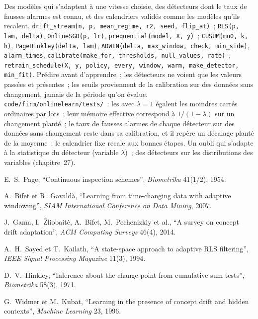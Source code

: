 \begin{build}
 Des modèles qui s'adaptent à une vitesse choisie, des détecteurs dont le taux de fausses alarmes est connu, et des calendriers validés comme
les modèles qu'ils recalent.
 \texttt{drift\_stream(n, p, mean\_regime, r2, seed, flip\_at)}~; \texttt{RLS(p, lam, delta)},
\texttt{OnlineSGD(p, lr)}, \texttt{prequential(model, X, y)}~; \texttt{CUSUM(mu0, k, h)}, \texttt{PageHinkley(delta, lam)},
\texttt{ADWIN(delta, max\_window, check, min\_side)}, \texttt{alarm\_times},
\texttt{calibrate(make\_for, thresholds, null\_values, rate)}~; \texttt{retrain\_schedule(X, y, policy, every, window, warm, make\_detector, min\_fit)}.
 Prédire avant d'apprendre~; les détecteurs ne voient que les valeurs passées et présentes~; les seuils proviennent de la calibration sur
des données sans changement, jamais de la période qu'on évalue.
 \texttt{code/firm/onlinelearn/tests/}~: les  avec $\lambda = 1$ égalent les moindres carrés ordinaires par lots~; leur mémoire effective
correspond à $1/(1-\lambda)$ sur un changement planté~; le taux de fausses alarmes de chaque détecteur sur des données sans changement reste dans
sa calibration, et il repère un décalage planté de la moyenne~; le calendrier fixe recale aux bonnes étapes.
 Un oubli qui s'adapte à la statistique du détecteur (variable $\lambda$)~; des détecteurs sur les
distributions des variables (chapitre~27).
\end{build}

\begin{omsources}
\item E.~S.~Page, ``Continuous inspection schemes'', \emph{Biometrika} 41(1/2), 1954.
\item A.~Bifet et R.~Gavaldà, ``Learning from time-changing data with adaptive windowing'', \emph{SIAM International
Conference on Data Mining}, 2007.
\item J.~Gama, I.~Žliobaitė, A.~Bifet, M.~Pechenizkiy et al., ``A survey on concept drift adaptation'', \emph{ACM
Computing Surveys} 46(4), 2014.
\item A.~H.~Sayed et T.~Kailath, ``A state-space approach to adaptive RLS filtering'', \emph{IEEE Signal Processing
Magazine} 11(3), 1994.
\item D.~V.~Hinkley, ``Inference about the change-point from cumulative sum tests'', \emph{Biometrika} 58(3), 1971.
\item G.~Widmer et M.~Kubat, ``Learning in the presence of concept drift and hidden contexts'', \emph{Machine Learning} 23,
1996.
\end{omsources}

